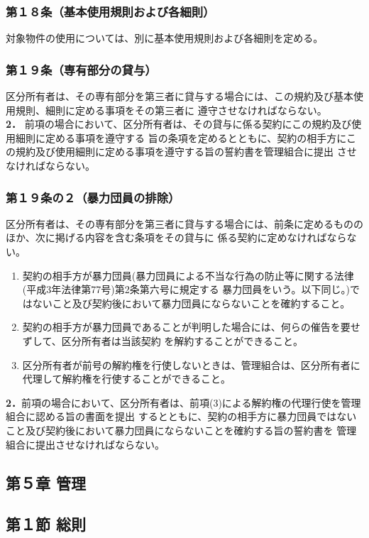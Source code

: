 \documentclass[12pt,uplatex,dvipdfmx]{jsarticle}
\begin{document}
\subsubsection*{第１８条（基本使用規則および各細則）}
対象物件の使用については、別に基本使用規則および各細則を定める。
\subsubsection*{第１９条（専有部分の貸与）}
区分所有者は、その専有部分を第三者に貸与する場合には、この規約及び基本使用規則、細則に定める事項をその第三者に
遵守させなければならない。\\
\textbf{2．} 前項の場合において、区分所有者は、その貸与に係る契約にこの規約及び使用細則に定める事項を遵守する
旨の条項を定めるとともに、契約の相手方にこの規約及び使用細則に定める事項を遵守する旨の誓約書を管理組合に提出
させなければならない。

\subsubsection*{第１９条の２（暴力団員の排除）}
区分所有者は、その専有部分を第三者に貸与する場合には、前条に定めるもののほか、次に掲げる内容を含む条項をその貸与に
係る契約に定めなければならない。
\begin{enumerate}
\item 契約の相手方が暴力団員(暴力団員による不当な行為の防止等に関する法律(平成3年法律第77号)第2条第六号に規定する
暴力団員をいう。以下同じ。)ではないこと及び契約後において暴力団員にならないことを確約すること。
\item 契約の相手方が暴力団員であることが判明した場合には、何らの催告を要せずして、区分所有者は当該契約
を解約することができること。
\item 区分所有者が前号の解約権を行使しないときは、管理組合は、区分所有者に代理して解約権を行使することができること。
\end{enumerate}
\textbf{2．}前項の場合において、区分所有者は、前項(3)による解約権の代理行使を管理組合に認める旨の書面を提出
するとともに、契約の相手方に暴力団員ではないこと及び契約後において暴力団員にならないことを確約する旨の誓約書を
管理組合に提出させなければならない。\\

\begin{center}
\subsection*{第５章 管理}
\subsection*{第１節 総則}
\end{center}
\end{document}
